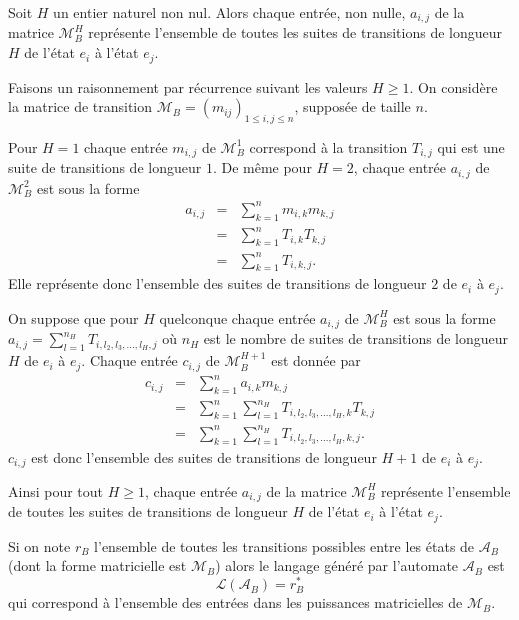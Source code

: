 \begin{Prop}\label{prop9}
Soit $H$ un entier naturel non nul. Alors chaque entrée, non nulle, $a_{i,j}$  de la matrice $\mathcal{M}_{B}^{H}$ représente l'ensemble de toutes les suites de transitions de longueur $H$ de l'état $e_{i}$ à l'état $e_{j}$.
\end{Prop}
\begin{Pre}
Faisons un raisonnement par récurrence suivant les valeurs $H\geq 1$.
On considère la matrice  de transition  $\mathcal{M}_{B}=(m_{ij})_{1\leq i,j\leq n}$, supposée de taille $n$.

Pour $H=1$ chaque entrée $m_{i,j}$ de $\mathcal{M}_{B}^{1}$  correspond à la transition $T_{i,j}$ qui est une suite de transitions de longueur $1$. De même pour $H=2$, chaque entrée $a_{i,j}$ de $\mathcal{M}_{B}^{2}$  est sous la forme
\begin{eqnarray*}
a_{i,j} &=& \sum_{k=1}^{n}m_{i,k}m_{k,j}\\
&=& \sum_{k=1}^{n}T_{i,k}T_{k,j}\\
&=& \sum_{k=1}^{n}T_{i,k,j}.
\end{eqnarray*}
Elle représente donc l'ensemble des suites de transitions de longueur $2$ de $e_{i}$ à $e_{j}$.

On suppose que pour $H$ quelconque  chaque entrée $a_{i,j}$ de $\mathcal{M}_{B}^{H}$ est sous la forme
$a_{i,j}=\displaystyle\sum_{l=1}^{n_{H}}  T_{i,l_{2},l_{3},...,l_{H},j}$ où $n_{H}$ est le nombre de suites de transitions de longueur $H$ de $e_{i}$ à $e_{j}$. Chaque entrée  $c_{i,j}$ de $\mathcal{M}_{B}^{H+1}$ est donnée par
\begin{eqnarray*}
c_{i,j} &=&\sum_{k=1}^{n}a_{i,k}m_{k,j}\\
& =&  \sum_{k=1}^{n}\sum_{l=1}^{n_{H}} T_{i,l_{2},l_{3},...,l_{H},k}T_{k,j}\\
& =& \sum_{k=1}^{n}\sum_{l=1}^{n_{H}}  T_{i,l_{2},l_{3},...,l_{H},k,j}.
\end{eqnarray*}
$c_{i,j}$ est donc l'ensemble des suites de transitions de longueur $H+1$ de $e_{i}$ à $e_{j}$.

Ainsi pour tout $H\geq 1$, chaque entrée $a_{i,j}$  de la matrice $\mathcal{M}_{B}^{H}$ représente l'ensemble de toutes les suites de transitions de longueur $H$ de l'état $e_{i}$ à l'état $e_{j}$.
\end{Pre}
\begin{Rem}
Si on note $r_{B}$ l'ensemble de toutes les transitions possibles entre les états de $\mathcal{A}_{B}$ (dont la forme matricielle est $\mathcal{M}_{B}$) alors le langage généré par l'automate $\mathcal{A}_{B}$ est 
$$\mathcal{L}(\mathcal{A}_{B})= r_{B}^{*} $$ qui correspond à l'ensemble des entrées dans les puissances matricielles de $\mathcal{M}_{B}$.
\end{Rem}

